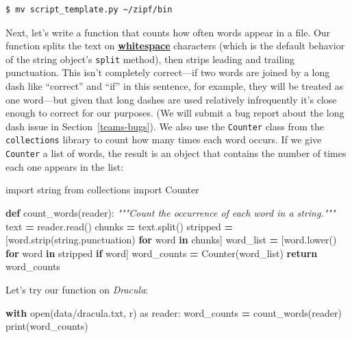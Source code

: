 \documentclass[
]{krantz}
\makeatletter
\newenvironment{Shaded}{\begin{snugshade}}{\end{snugshade}}
\newcommand{\BuiltInTok}[1]{#1}
\newcommand{\CommentTok}[1]{\textcolor[rgb]{0.56,0.35,0.01}{\textit{#1}}}
\newcommand{\ControlFlowTok}[1]{\textcolor[rgb]{0.13,0.29,0.53}{\textbf{#1}}}
\newcommand{\ImportTok}[1]{#1}
\newcommand{\KeywordTok}[1]{\textcolor[rgb]{0.13,0.29,0.53}{\textbf{#1}}}
\newcommand{\NormalTok}[1]{#1}
\newcommand{\OperatorTok}[1]{\textcolor[rgb]{0.81,0.36,0.00}{\textbf{#1}}}
\newcommand{\StringTok}[1]{\textcolor[rgb]{0.31,0.60,0.02}{#1}}
\newenvironment{kframe}{%
\medskip{}
\setlength{\fboxsep}{.8em}
 \def\at@end@of@kframe{}%
 \ifinner\ifhmode%
  \def\at@end@of@kframe{\end{minipage}}%
  \begin{minipage}{\columnwidth}%
 \fi\fi%
 \def\FrameCommand##1{\hskip\@totalleftmargin \hskip-\fboxsep
 \colorbox{shadecolor}{##1}\hskip-\fboxsep
     \hskip-\linewidth \hskip-\@totalleftmargin \hskip\columnwidth}%
 \MakeFramed {\advance\hsize-\width
   \@totalleftmargin\z@ \linewidth\hsize
   \@setminipage}}%
 {\par\unskip\endMakeFramed%
 \at@end@of@kframe}
\renewenvironment{Shaded}{\begin{kframe}}{\end{kframe}}
\newcommand{\gref}[2]{\hyperlink{#2}{\textbf{#1}}}
\makeatother
\begin{document}
\begin{verbatim}
$ mv script_template.py ~/zipf/bin
\end{verbatim}

Next,
let's write a function that counts how often words appear in a file.
Our function splits the text on \gref{whitespace}{whitespace} characters
(which is the default behavior of the string object's \texttt{split} method),
then strips leading and trailing punctuation.
This isn't completely correct---if two words are joined by a long dash
like ``correct'' and ``if'' in this sentence, for example,
they will be treated as one word---but given that long dashes are used relatively
infrequently it's close enough to correct for our purposes.
(We will submit a bug report about the long dash issue in Section~\ref{teams-bugs}).
We also use the \texttt{Counter} class from the \texttt{collections} library
to count how many times each word occurs.
If we give \texttt{Counter} a list of words,
the result is an object that contains
the number of times each one appears in the list:

\begin{Shaded}
\begin{Highlighting}[]
\ImportTok{import}\NormalTok{ string}
\ImportTok{from}\NormalTok{ collections }\ImportTok{import}\NormalTok{ Counter}


\KeywordTok{def}\NormalTok{ count\_words(reader):}
    \CommentTok{"""Count the occurrence of each word in a string."""}
\NormalTok{    text }\OperatorTok{=}\NormalTok{ reader.read()}
\NormalTok{    chunks }\OperatorTok{=}\NormalTok{ text.split()}
\NormalTok{    stripped }\OperatorTok{=}\NormalTok{ [word.strip(string.punctuation) }\ControlFlowTok{for}\NormalTok{ word }\KeywordTok{in}\NormalTok{ chunks]}
\NormalTok{    word\_list }\OperatorTok{=}\NormalTok{ [word.lower() }\ControlFlowTok{for}\NormalTok{ word }\KeywordTok{in}\NormalTok{ stripped }\ControlFlowTok{if}\NormalTok{ word]}
\NormalTok{    word\_counts }\OperatorTok{=}\NormalTok{ Counter(word\_list)}
    \ControlFlowTok{return}\NormalTok{ word\_counts}
\end{Highlighting}
\end{Shaded}

Let's try our function on \emph{Dracula}:

\begin{Shaded}
\begin{Highlighting}[]
\ControlFlowTok{with} \BuiltInTok{open}\NormalTok{(}\StringTok{\textquotesingle{}data/dracula.txt\textquotesingle{}}\NormalTok{, }\StringTok{\textquotesingle{}r\textquotesingle{}}\NormalTok{) }\ImportTok{as}\NormalTok{ reader:}
\NormalTok{    word\_counts }\OperatorTok{=}\NormalTok{ count\_words(reader)}
\BuiltInTok{print}\NormalTok{(word\_counts)}
\end{Highlighting}
\end{Shaded}
\end{document}
